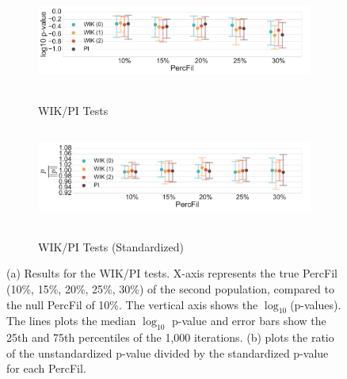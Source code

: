 \documentclass[12pt]{article}
\begin{document}
\begin{figure}[htp!]
  \centering
  \begin{subfigure}{.75\textwidth}
    \centering
    \caption{WIK/PI Tests}
    \includegraphics[height = 1.25in]{figure_8_weighted_contour_group.pdf}
    \label{fig:sub_weight}
  \end{subfigure}
  \begin{subfigure}{.75\textwidth}
    \centering
    \caption{WIK/PI Tests (Standardized)}
    \includegraphics[height = 1.25in]{figure_8_joint_weighted_contour_group.pdf}
    \label{fig:sub_weight_normed}
  \end{subfigure}
\label{fig:sub_weight_results}
\caption{(a) Results for the WIK/PI tests. X-axis represents the true PercFil (10\%, 15\%, 20\%, 25\%, 30\%) of the second population, compared to the null PercFil of 10\%. The vertical axis shows the $\log_{10}$(p-values). The lines plots the median $\log_{10}$ p-value and error bars show the 25th and 75th percentiles of the 1,000 iterations. (b) plots the ratio of the unstandardized p-value divided by the standardized p-value for each PercFil. }

\end{figure}
\end{document}
